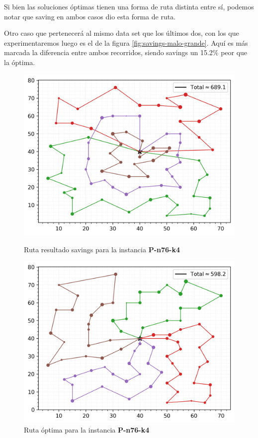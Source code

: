 Si bien las soluciones óptimas tienen una forma de ruta distinta entre sí, podemos notar que saving en ambos casos dio esta forma de ruta. 
\par Otro caso que pertenecerá al mismo data set que los últimos dos, con los que experimentaremos luego es el de la figura \ref{fig:savings-malo-grande}. Aquí es más marcada la diferencia entre ambos recorridos, siendo savings un 15.2\% peor que la óptima.
\begin{figure}[H]
	\centering
	\begin{minipage}{0.35\textwidth}
		\centering
		\includegraphics[width=1\textwidth]{images/savings/malosavinggrande}
		\caption{\footnotesize Ruta resultado savings para la instancia \textbf{P-n76-k4}}
		\label{fig:savings-malo-grande}
	\end{minipage}%
	\hspace{0.03\textwidth}
	\begin{minipage}{0.35\textwidth}
		\centering
		\includegraphics[width=1\textwidth]{images/savings/optimogrande}
		\caption{\footnotesize Ruta óptima para la instancia \textbf{P-n76-k4}}
		\label{fig:savings-optimo-grande}
	\end{minipage}%
\end{figure}

